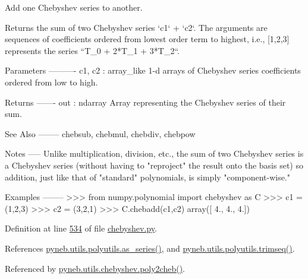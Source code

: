 \begin{DoxyVerb}Add one Chebyshev series to another.

Returns the sum of two Chebyshev series `c1` + `c2`.  The arguments
are sequences of coefficients ordered from lowest order term to
highest, i.e., [1,2,3] represents the series ``T_0 + 2*T_1 + 3*T_2``.

Parameters
----------
c1, c2 : array_like
    1-d arrays of Chebyshev series coefficients ordered from low to
    high.

Returns
-------
out : ndarray
    Array representing the Chebyshev series of their sum.

See Also
--------
chebsub, chebmul, chebdiv, chebpow

Notes
-----
Unlike multiplication, division, etc., the sum of two Chebyshev series
is a Chebyshev series (without having to "reproject" the result onto
the basis set) so addition, just like that of "standard" polynomials,
is simply "component-wise."

Examples
--------
>>> from numpy.polynomial import chebyshev as C
>>> c1 = (1,2,3)
>>> c2 = (3,2,1)
>>> C.chebadd(c1,c2)
array([ 4.,  4.,  4.])\end{DoxyVerb}
 

Definition at line \hyperlink{chebyshev_8py_source_l00534}{534} of file \hyperlink{chebyshev_8py_source}{chebyshev.\-py}.



References \hyperlink{polyutils_8py_source_l00115}{pyneb.\-utils.\-polyutils.\-as\-\_\-series()}, and \hyperlink{polyutils_8py_source_l00085}{pyneb.\-utils.\-polyutils.\-trimseq()}.



Referenced by \hyperlink{chebyshev_8py_source_l00309}{pyneb.\-utils.\-chebyshev.\-poly2cheb()}.


